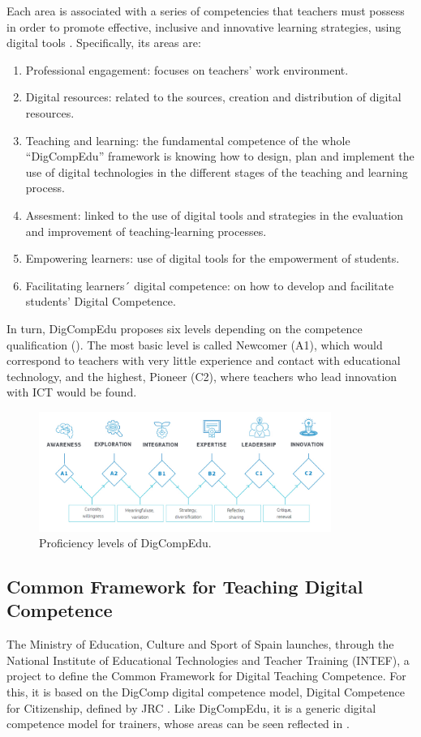 \documentclass{textolivre}
\begin{document}
Each area is associated with a series of competencies that teachers must
possess in order to promote effective, inclusive and innovative learning
strategies, using digital tools \cite{redecker2017}. Specifically, its
areas are:

\begin{enumerate}
\item Professional engagement: focuses on teachers' work environment.
\item Digital resources: related to the sources, creation and distribution of digital resources.
\item Teaching and learning: the fundamental competence of the whole
“DigCompEdu” framework is knowing how to design, plan and implement the use of
digital technologies in the different stages of the teaching and learning
process.
\item Assesment: linked to the use of digital tools and strategies in the evaluation and improvement of teaching-learning processes.
\item Empowering learners: use of digital tools for the empowerment of students.
\item Facilitating learners´ digital competence: on how to develop and facilitate students' Digital Competence.
\end{enumerate}

In turn, DigCompEdu proposes six levels depending on the competence
qualification (). The most basic level is called Newcomer (A1), which
would correspond to teachers with very little experience and contact with
educational technology, and the highest, Pioneer (C2), where teachers who lead
innovation with ICT would be found.

\begin{figure}[htbp]
 \centering
 \includegraphics[width=0.85\textwidth]{fig02.jpg}
 \caption{Proficiency levels of DigCompEdu.}
 \label{fig02}
\end{figure}




\subsection{Common Framework for Teaching Digital Competence}\label{sec-common-fram}
The Ministry of Education, Culture and Sport of Spain launches, through the
National Institute of Educational Technologies and Teacher Training (INTEF), a
project to define the Common Framework for Digital Teaching Competence. For
this, it is based on the DigComp digital competence model, Digital Competence
for Citizenship, defined by JRC \cite{ferrari2013,vuorikari2016,intef2017}.
Like DigCompEdu, it is a generic digital
competence model for trainers, whose areas can be seen reflected in .
\end{document}
